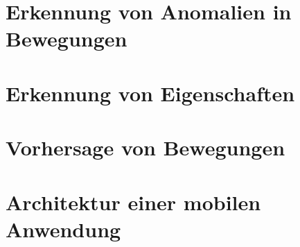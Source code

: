 \section{Erkennung von Anomalien in Bewegungen}
\section{Erkennung von Eigenschaften}
\section{Vorhersage von Bewegungen}
\section{Architektur einer mobilen Anwendung}